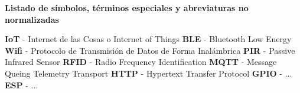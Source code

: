 \renewcommand{\thepage}{\Roman{page}}
    \textbf{\Large Listado de símbolos, términos especiales y abreviaturas no normalizadas}\newline

    \textbf{IoT} - Internet de las Cosas o Internet of Things
    \newline
    \textbf{BLE} - Bluetooth Low Energy
    \newline
    \textbf{Wifi} - Protocolo de Transmisión de Datos de Forma Inalámbrica
    \newline
    \textbf{PIR} - Passive Infrared Sensor
    \newline
    \textbf{RFID} - Radio Frequency Identification
    \newline
    \textbf{MQTT} - Message Queing Telemetry Transport
    \newline
    \textbf{HTTP} - Hypertext Transfer Protocol
    \newline
    \textbf{GPIO} - ...
    \newline
    \textbf{ESP} - ...
    
    \setcounter{page}{1}
    \thispagestyle{plain}